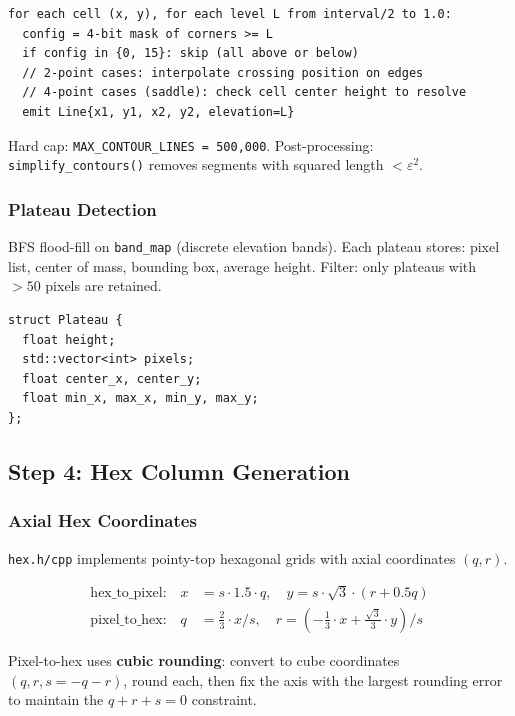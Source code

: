 \documentclass[11pt,a4paper]{article}
\begin{document}
\begin{lstlisting}[caption={Marching squares pseudocode},numbers=none]
for each cell (x, y), for each level L from interval/2 to 1.0:
  config = 4-bit mask of corners >= L
  if config in {0, 15}: skip (all above or below)
  // 2-point cases: interpolate crossing position on edges
  // 4-point cases (saddle): check cell center height to resolve
  emit Line{x1, y1, x2, y2, elevation=L}
\end{lstlisting}

Hard cap: \texttt{MAX\_CONTOUR\_LINES = 500{,}000}. Post-processing: \texttt{simplify\_contours()} removes segments with squared length $< \varepsilon^2$.

\subsubsection{Plateau Detection}

BFS flood-fill on \texttt{band\_map} (discrete elevation bands). Each plateau stores: pixel list, center of mass, bounding box, average height. Filter: only plateaus with $>50$ pixels are retained.

\begin{lstlisting}[caption={Plateau structure}]
struct Plateau {
  float height;
  std::vector<int> pixels;
  float center_x, center_y;
  float min_x, max_x, min_y, max_y;
};
\end{lstlisting}

\subsection{Step 4: Hex Column Generation}
\label{sec:hex}

\subsubsection{Axial Hex Coordinates}

\texttt{hex.h/cpp} implements pointy-top hexagonal grids with axial coordinates $(q, r)$.

\begin{align}
  \text{hex\_to\_pixel:} \quad x &= s \cdot 1.5 \cdot q, \quad y = s \cdot \sqrt{3} \cdot (r + 0.5q) \\
  \text{pixel\_to\_hex:} \quad q &= \tfrac{2}{3} \cdot x / s, \quad r = (-\tfrac{1}{3} \cdot x + \tfrac{\sqrt{3}}{3} \cdot y) / s
\end{align}

Pixel-to-hex uses \textbf{cubic rounding}: convert to cube coordinates $(q, r, s=-q-r)$, round each, then fix the axis with the largest rounding error to maintain the $q+r+s=0$ constraint.
\end{document}
